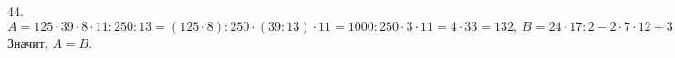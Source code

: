 44. $A=125\cdot39\cdot8\cdot11:250:13=(125\cdot8):250\cdot(39:13)\cdot11=1000:250\cdot3\cdot11=4\cdot33=132,\ B=24\cdot17:2-2\cdot7\cdot12+3\cdot45\cdot4-(5+7)\cdot37=17\cdot12-14\cdot12+45\cdot12-37\cdot12=12\cdot(17-14+45-37)=12\cdot11=132.$ Значит, $A=B.$\\
